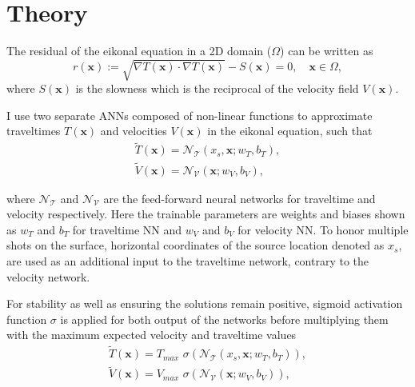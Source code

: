 \section{Theory}
\label{sec:theory}

The residual of the eikonal equation in a 2D domain ($\Omega$) can be written as
\begin{equation}
    \label{eqn:eik_res}
    r(\boldsymbol{x}):= \sqrt{\nabla T(\boldsymbol{x})\cdot\nabla T(\boldsymbol{x} )}-S(\boldsymbol{x}) = 0, \quad \boldsymbol{x} \in \Omega, 
\end{equation}
where $S(\boldsymbol{x})$ is the slowness which is the reciprocal of the velocity field $V(\boldsymbol{x})$. 

I use two separate ANNs composed of non-linear functions to approximate traveltimes $T(\boldsymbol{x})$ and velocities $V(\boldsymbol{x})$ in the eikonal equation, such that
\begin{equation}
\begin{aligned}
    \label{eqn:network_approx}
     \tilde{T}(\boldsymbol{x}) = \mathcal{N_{T}}(x_{s},\boldsymbol{x};w_{T},b_{T}), \\
     \tilde{V}(\boldsymbol{x}) = \mathcal{N_{V}}(\boldsymbol{x};w_{V},b_{V}),
\end{aligned}     
\end{equation}

where $\mathcal{N_{T}}$ and $\mathcal{N_{V}}$ are the feed-forward neural networks for traveltime and velocity respectively. Here the trainable parameters are weights and biases shown as $w_{T}$ and $b_{T}$ for traveltime NN and $w_{V}$ and $b_{V}$ for velocity NN. To honor multiple shots on the surface, horizontal coordinates of the source location denoted as $x_{s}$, are used as an additional input to the traveltime network, contrary to the velocity network. 

For stability as well as ensuring the solutions remain positive, sigmoid activation function $\sigma$ is applied for both output of the networks before multiplying them with the maximum expected velocity and traveltime values
\begin{equation}
\begin{aligned}
    \label{eqn:network_approx_sigmoid}
     \tilde{T}(\boldsymbol{x}) = T_{max}\,\, \sigma(\mathcal{N_{T}}(x_{s},\boldsymbol{x};w_{T},b_{T})), \\
     \tilde{V}(\boldsymbol{x}) = V_{max}\,\, \sigma(\mathcal{N_{V}}(\boldsymbol{x};w_{V},b_{V})),
\end{aligned}     
\end{equation}

